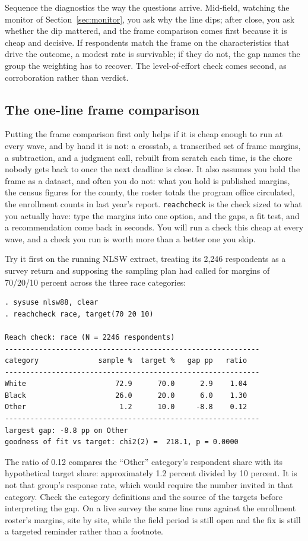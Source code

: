 \documentclass[
    a4paper,
    fontsize=10pt,
    twoside=true,
    numbers=noenddot,
]{kaobook}
\begin{document}
Sequence the diagnostics the way the questions arrive. Mid-field, watching the monitor of Section~\ref{sec:monitor}, you ask why the line dips; after close, you ask whether the dip mattered, and the frame comparison comes first because it is cheap and decisive. If respondents match the frame on the characteristics that drive the outcome, a modest rate is survivable; if they do not, the gap names the group the weighting has to recover. The level-of-effort check comes second, as corroboration rather than verdict.

\subsection{The one-line frame comparison}\label{sec:ch05-reach}
Putting the frame comparison first only helps if it is cheap enough to run at every wave, and by hand it is not: a crosstab, a transcribed set of frame margins, a subtraction, and a judgment call, rebuilt from scratch each time, is the chore nobody gets back to once the next deadline is close. It also assumes you hold the frame as a dataset, and often you do not: what you hold is published margins, the census figures for the county, the roster totals the program office circulated, the enrollment counts in last year's report. \texttt{reachcheck} is the check sized to what you actually have: type the margins into one option, and the gaps, a fit test, and a recommendation come back in seconds. You will run a check this cheap at every wave, and a check you run is worth more than a better one you skip.

Try it first on the running NLSW extract, treating its 2{,}246 respondents as a survey return and supposing the sampling plan had called for margins of 70/20/10 percent across the three race categories:
\par
{\footnotesize
\begin{verbatim}
. sysuse nlsw88, clear
. reachcheck race, target(70 20 10)

Reach check: race (N = 2246 respondents)
------------------------------------------------------------
category              sample %  target %   gap pp   ratio
------------------------------------------------------------
White                     72.9      70.0      2.9    1.04
Black                     26.0      20.0      6.0    1.30
Other                      1.2      10.0     -8.8    0.12
------------------------------------------------------------
largest gap: -8.8 pp on Other
goodness of fit vs target: chi2(2) =  218.1, p = 0.0000
\end{verbatim}
}
The ratio of 0.12 compares the \enquote{Other} category's respondent share with its hypothetical target share: approximately 1.2 percent divided by 10 percent. It is not that group's response rate, which would require the number invited in that category. Check the category definitions and the source of the targets before interpreting the gap. On a live survey the same line runs against the enrollment roster's margins, site by site, while the field period is still open and the fix is still a targeted reminder rather than a footnote.
\end{document}
